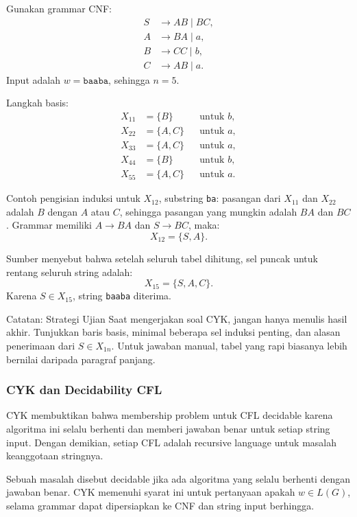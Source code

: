Gunakan grammar CNF:
\[
\begin{aligned}
S &\rightarrow AB \mid BC,\\
A &\rightarrow BA \mid a,\\
B &\rightarrow CC \mid b,\\
C &\rightarrow AB \mid a.
\end{aligned}
\]
Input adalah $w=\texttt{baaba}$, sehingga $n=5$.

Langkah basis:
\[
\begin{aligned}
X_{11}&=\{B\} && \text{untuk } b,\\
X_{22}&=\{A,C\} && \text{untuk } a,\\
X_{33}&=\{A,C\} && \text{untuk } a,\\
X_{44}&=\{B\} && \text{untuk } b,\\
X_{55}&=\{A,C\} && \text{untuk } a.
\end{aligned}
\]

Contoh pengisian induksi untuk $X_{12}$, substring \texttt{ba}: pasangan dari $X_{11}$ dan $X_{22}$ adalah $B$ dengan $A$ atau $C$, sehingga pasangan yang mungkin adalah $BA$ dan $BC$. Grammar memiliki $A\rightarrow BA$ dan $S\rightarrow BC$, maka:
\[
    X_{12}=\{S,A\}.
\]

Sumber menyebut bahwa setelah seluruh tabel dihitung, sel puncak untuk rentang seluruh string adalah:
\[
    X_{15}=\{S,A,C\}.
\]
Karena $S\in X_{15}$, string \texttt{baaba} diterima.

\begin{cmt}{Catatan: Strategi Ujian}{}
Saat mengerjakan soal CYK, jangan hanya menulis hasil akhir. Tunjukkan baris basis, minimal beberapa sel induksi penting, dan alasan penerimaan dari $S\in X_{1n}$. Untuk jawaban manual, tabel yang rapi biasanya lebih bernilai daripada paragraf panjang.
\end{cmt}

\subsubsection{CYK dan Decidability CFL}

\begin{jawab}
CYK membuktikan bahwa membership problem untuk CFL decidable karena algoritma ini selalu berhenti dan memberi jawaban benar untuk setiap string input. Dengan demikian, setiap CFL adalah recursive language untuk masalah keanggotaan stringnya.
\end{jawab}

Sebuah masalah disebut decidable jika ada algoritma yang selalu berhenti dengan jawaban benar. CYK memenuhi syarat ini untuk pertanyaan apakah $w\in L(G)$, selama grammar dapat dipersiapkan ke CNF dan string input berhingga.


